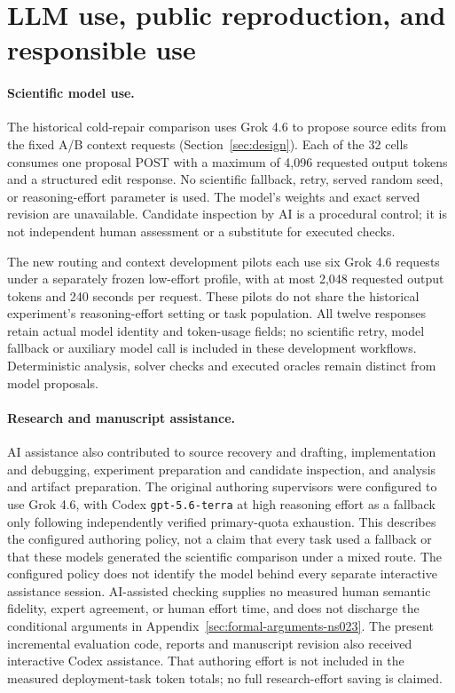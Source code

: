 \section{LLM use, public reproduction, and responsible use}
\label{sec:ns024-disclosures}

\paragraph{Scientific model use.}
The historical cold-repair comparison uses Grok 4.6 to propose source edits from
the fixed A/B context requests (Section~\ref{sec:design}). Each of the 32 cells
consumes one proposal POST with a maximum of 4,096 requested output tokens and
a structured edit response. No scientific fallback, retry, served random seed,
or reasoning-effort parameter is used. The model's weights and exact served
revision are unavailable. Candidate inspection by AI is a procedural control;
it is not independent human assessment or a substitute for executed checks.

The new routing and context development pilots each use six Grok 4.6 requests
under a separately frozen low-effort profile, with at most 2,048 requested
output tokens and 240 seconds per request. These pilots do not share the
historical experiment's reasoning-effort setting or task population. All twelve
responses retain actual model identity and token-usage fields; no scientific
retry, model fallback or auxiliary model call is included in these development
workflows. Deterministic analysis, solver checks and executed oracles remain
distinct from model proposals.

\paragraph{Research and manuscript assistance.}
AI assistance also contributed to source recovery and drafting, implementation
and debugging, experiment preparation and candidate inspection, and analysis
and artifact preparation. The original authoring supervisors were configured to use
Grok 4.6, with Codex \texttt{gpt-5.6-terra} at high reasoning effort as a fallback
only following independently verified primary-quota exhaustion. This describes
the configured authoring policy, not a claim that every task used a fallback or
that these models generated the scientific comparison under a mixed route.
The configured policy does not identify the model behind every separate
interactive assistance session. AI-assisted checking supplies no measured
human semantic fidelity, expert agreement, or human effort time, and does not
discharge the conditional arguments in Appendix~\ref{sec:formal-arguments-ns023}.
The present incremental evaluation code, reports and manuscript revision also
received interactive Codex assistance. That authoring effort is not included in
the measured deployment-task token totals; no full research-effort saving is
claimed.

